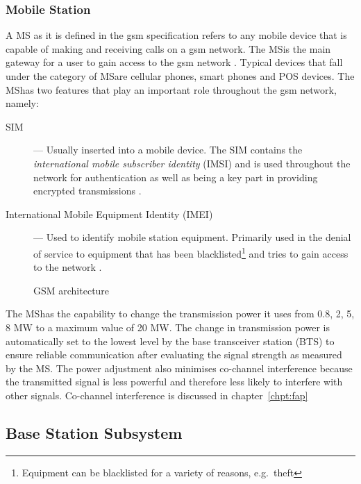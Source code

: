 \subsubsection{Mobile Station}
A \gls{MS} as it is defined in the \gls{gsm} specification refers to any mobile device that is capable of making and receiving calls on a \gls{gsm} network.  The \gls{MS}is the main gateway 
for a user to gain access to the \gls{gsm} network \cite{Eisenblatter,GSMArchitectureProtocolsServices}. Typical devices that fall under the category of \gls{MS}are cellular phones, smart phones and \gls{POS} devices. The \gls{MS}has two features that play an important role throughout the \gls{gsm} network, namely:
\begin{description}
  \item[\gls{SIM}] --- Usually inserted into a mobile device. The SIM contains the \emph{international mobile subscriber identity} (IMSI) and is used throughout the network for authentication as well as being a key part in providing encrypted transmissions \cite{Eisenblatter}.
\item[International Mobile Equipment Identity (IMEI)] --- Used to identify mobile station equipment. Primarily used in the denial of service to equipment that has been blacklisted\footnote{Equipment can be blacklisted for a variety of reasons, e.g.\ theft} and tries to gain access to the network \cite{Eisenblatter}.
\end{description}
\begin{figure}[H]
	\begin{centering}
		
		\caption{GSM architecture\cite{GSMArchitectureProtocolsServices}}
		\label{fig:GSMArchitecture}
	\end{centering}
\end{figure}
The \gls{MS}has the capability to change the transmission power it uses from 0.8, 2, 5, 8 MW to a maximum value of 20 MW\cite{GSMSysEngin}. The change in transmission power is automatically set to the lowest level by the base transceiver station (BTS) to ensure reliable communication after evaluating the signal strength as measured by the \gls{MS}\cite{GSMSysEngin,GSMArchitectureProtocolsServices}. The power adjustment also minimises co-channel interference because the transmitted signal is less powerful and therefore less likely to interfere with other signals\cite{GSMSysEngin}. Co-channel interference is discussed in chapter~\ref{chpt:fap}

\subsection{Base Station Subsystem}

